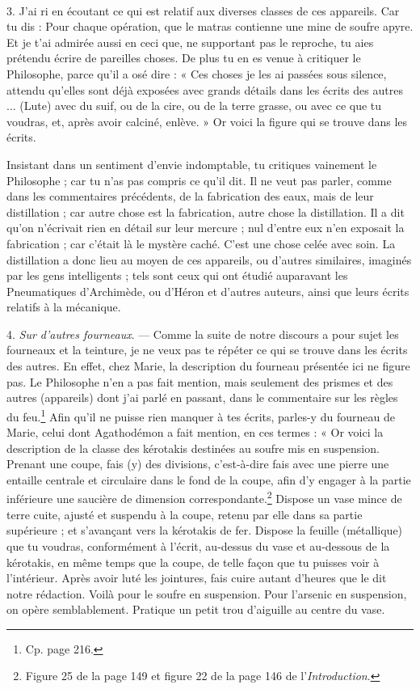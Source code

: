 \documentclass[a4paper, 11pt, oneside, polutonikogreek, french]{article}
\begin{document}
\paragraph{}
3. J'ai ri en écoutant ce qui est relatif aux diverses classes de ces appareils. Car tu dis : Pour chaque opération, que le matras contienne une mine de soufre apyre. Et je t'ai admirée aussi en ceci que, ne supportant pas le reproche, tu aies prétendu écrire de pareilles choses. De plus tu en es venue à critiquer le Philosophe, parce qu'il a osé dire : « Ces choses je les ai passées sous silence, attendu qu'elles sont déjà exposées avec grands détails dans les écrits des autres ... (Lute) avec du suif, ou de la cire, ou de la terre grasse, ou avec ce que tu voudras, et, après avoir calciné, enlève. » Or voici la figure qui se trouve dans les écrits.

Insistant dans un sentiment d'envie indomptable, tu critiques vainement le Philosophe ; car tu n'as pas compris ce qu'il dit. Il ne veut pas parler, comme dans les commentaires précédents, de la fabrication des eaux, mais de leur distillation ; car autre chose est la fabrication, autre chose la distillation. Il a dit qu'on n'écrivait rien en détail sur leur mercure ; nul d'entre eux n'en exposait la fabrication ; car c'était là le mystère caché. C'est une chose celée avec soin. La distillation a donc lieu au moyen de ces appareils, ou d'autres similaires, imaginés par les gens intelligents ; tels sont ceux qui ont étudié auparavant les Pneumatiques d'Archimède, ou d'Héron et d'autres auteurs, ainsi que leurs écrits relatifs à la mécanique.

4. \emph{Sur d'autres fourneaux}. --- Comme la suite de notre discours a pour sujet les fourneaux et la teinture, je ne veux pas te répéter ce qui se trouve dans les écrits des autres. En effet, chez Marie, la description du fourneau présentée ici ne figure pas. Le Philosophe n'en a pas fait mention, mais seulement des prismes et des autres (appareils) dont j'ai parlé en passant, dans le commentaire sur les règles du feu.\footnote{Cp. page 216.} Afin qu'il ne puisse rien manquer à tes écrits, parles-y du fourneau de Marie, celui dont Agathodémon a fait mention, en ces termes : « Or voici la description de la classe des kérotakis destinées au soufre mis en suspension. Prenant une coupe, fais (y) des divisions, c'est-à-dire fais avec une pierre une entaille centrale et circulaire dans le fond de la coupe, afin d'y engager à la partie inférieure une saucière de dimension correspondante.\footnote{Figure 25 de la page 149 et figure 22 de la page 146 de l'\emph{Introduction}.} Dispose un vase mince de terre cuite, ajusté et suspendu à la coupe, retenu par elle dans sa partie supérieure ; et s'avançant vers la kérotakis de fer. Dispose la feuille (métallique) que tu voudras, conformément à l'écrit, au-dessus du vase et au-dessous de la kérotakis, en même temps que la coupe, de telle façon que tu puisses voir à l'intérieur. Après avoir luté les jointures, fais cuire autant d'heures que le dit notre rédaction. Voilà pour le soufre en suspension. Pour l'arsenic en suspension, on opère semblablement. Pratique un petit trou d'aiguille au centre du vase.
\end{document}
